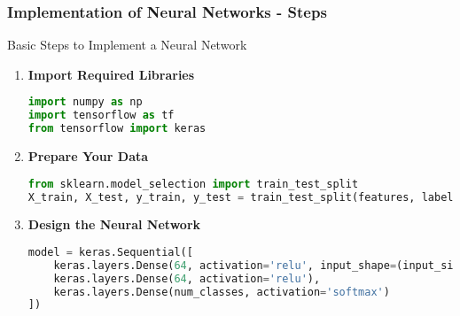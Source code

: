 \documentclass[aspectratio=169]{beamer}
\begin{document}
\begin{frame}[fragile]
    \frametitle{Implementation of Neural Networks - Steps}
    \begin{block}{Basic Steps to Implement a Neural Network}
        \begin{enumerate}
            \item \textbf{Import Required Libraries}
            \begin{lstlisting}[language=Python]
import numpy as np
import tensorflow as tf
from tensorflow import keras
            \end{lstlisting}
            
            \item \textbf{Prepare Your Data}
            \begin{lstlisting}[language=Python]
from sklearn.model_selection import train_test_split
X_train, X_test, y_train, y_test = train_test_split(features, labels, test_size=0.2)
            \end{lstlisting}
            
            \item \textbf{Design the Neural Network}
            \begin{lstlisting}[language=Python]
model = keras.Sequential([
    keras.layers.Dense(64, activation='relu', input_shape=(input_size,)),  # Input layer
    keras.layers.Dense(64, activation='relu'),                            # Hidden layer
    keras.layers.Dense(num_classes, activation='softmax')                # Output layer
])
            \end{lstlisting}
        \end{enumerate}
    \end{block}
\end{frame}
\end{document}
